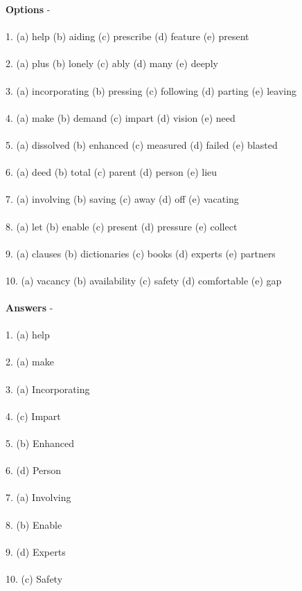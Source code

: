 \documentclass[a4paper,30pt]{report}
\begin{document}
      \textbf{Options} -\\\\ 
1. (a) help (b) aiding
(c) prescribe (d) feature
(e) present\\\\
2. (a) plus (b) lonely
(c) ably (d) many
(e) deeply\\\\
3. (a) incorporating (b) pressing
(c) following (d) parting
(e) leaving\\\\
4. (a) make (b) demand
(c) impart (d) vision
(e) need\\\\
5. (a) dissolved (b) enhanced
(c) measured (d) failed
(e) blasted\\\\
6. (a) deed (b) total
(c) parent (d) person
(e) lieu\\\\
7. (a) involving (b) saving
(c) away (d) off
(e) vacating\\\\
8. (a) let (b) enable
(c) present (d) pressure
(e) collect\\\\
9. (a) clauses (b) dictionaries
(c) books (d) experts
(e) partners\\\\
10. (a) vacancy (b) availability
(c) safety (d) comfortable
(e) gap\\\\

     \textbf{Answers} - \\\\
1. (a) help\\\\
2. (a) make \\\\
3. (a) Incorporating\\\\
4. (c) Impart \\\\
5. (b) Enhanced \\\\
6. (d) Person \\\\
7. (a) Involving\\\\
8. (b) Enable \\\\
9. (d) Experts \\\\
10. (c) Safety \\\\
\end{document}
